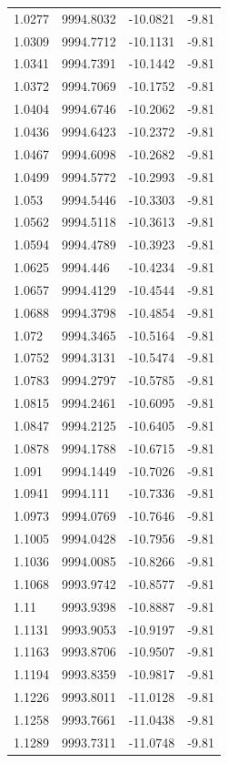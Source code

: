 \begin{table}[H]
\begin{tabular}{llll}
1.0277 & 9994.8032 & -10.0821 & -9.81 \\
1.0309 & 9994.7712 & -10.1131 & -9.81 \\
1.0341 & 9994.7391 & -10.1442 & -9.81 \\
1.0372 & 9994.7069 & -10.1752 & -9.81 \\
1.0404 & 9994.6746 & -10.2062 & -9.81 \\
1.0436 & 9994.6423 & -10.2372 & -9.81 \\
1.0467 & 9994.6098 & -10.2682 & -9.81 \\
1.0499 & 9994.5772 & -10.2993 & -9.81 \\
1.053 & 9994.5446 & -10.3303 & -9.81 \\
1.0562 & 9994.5118 & -10.3613 & -9.81 \\
1.0594 & 9994.4789 & -10.3923 & -9.81 \\
1.0625 & 9994.446 & -10.4234 & -9.81 \\
1.0657 & 9994.4129 & -10.4544 & -9.81 \\
1.0688 & 9994.3798 & -10.4854 & -9.81 \\
1.072 & 9994.3465 & -10.5164 & -9.81 \\
1.0752 & 9994.3131 & -10.5474 & -9.81 \\
1.0783 & 9994.2797 & -10.5785 & -9.81 \\
1.0815 & 9994.2461 & -10.6095 & -9.81 \\
1.0847 & 9994.2125 & -10.6405 & -9.81 \\
1.0878 & 9994.1788 & -10.6715 & -9.81 \\
1.091 & 9994.1449 & -10.7026 & -9.81 \\
1.0941 & 9994.111 & -10.7336 & -9.81 \\
1.0973 & 9994.0769 & -10.7646 & -9.81 \\
1.1005 & 9994.0428 & -10.7956 & -9.81 \\
1.1036 & 9994.0085 & -10.8266 & -9.81 \\
1.1068 & 9993.9742 & -10.8577 & -9.81 \\
1.11 & 9993.9398 & -10.8887 & -9.81 \\
1.1131 & 9993.9053 & -10.9197 & -9.81 \\
1.1163 & 9993.8706 & -10.9507 & -9.81 \\
1.1194 & 9993.8359 & -10.9817 & -9.81 \\
1.1226 & 9993.8011 & -11.0128 & -9.81 \\
1.1258 & 9993.7661 & -11.0438 & -9.81 \\
1.1289 & 9993.7311 & -11.0748 & -9.81 \\

\end{tabular}
\end{table}
